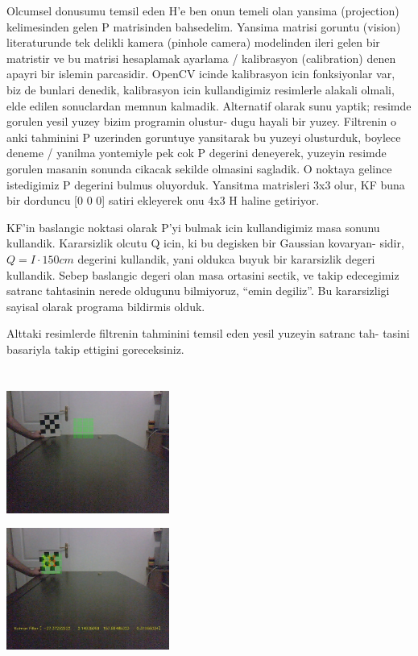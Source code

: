 \documentclass[12pt,fleqn]{article}\usepackage{../common}
\begin{document}
Olcumsel donusumu temsil eden H'e ben onun temeli olan yansima (projection)
kelimesinden gelen P matrisinden bahsedelim. Yansima matrisi goruntu
(vision) literaturunde tek delikli kamera (pinhole camera) modelinden ileri
gelen bir matristir ve bu matrisi hesaplamak ayarlama / kalibrasyon
(calibration) denen apayri bir islemin parcasidir. OpenCV icinde
kalibrasyon icin fonksiyonlar var, biz de bunlari denedik, kalibrasyon icin
kullandigimiz resimlerle alakali olmali, elde edilen sonuclardan memnun
kalmadik. Alternatif olarak sunu yaptik; resimde gorulen yesil yuzey bizim
programin olustur- dugu hayali bir yuzey. Filtrenin o anki tahminini P
uzerinden goruntuye yansitarak bu yuzeyi olusturduk, boylece deneme /
yanilma yontemiyle pek cok P degerini deneyerek, yuzeyin resimde gorulen
masanin sonunda cikacak sekilde olmasini sagladik. O noktaya gelince
istedigimiz P degerini bulmus oluyorduk. Yansitma matrisleri 3x3 olur, KF
buna bir dorduncu [0 0 0] satiri ekleyerek onu 4x3 H haline getiriyor.

KF'in baslangic noktasi olarak P'yi bulmak icin kullandigimiz masa sonunu
kullandik. Kararsizlik olcutu Q icin, ki bu degisken bir Gaussian kovaryan-
sidir, $Q = I \cdot 150 cm$ degerini kullandik, yani oldukca buyuk bir
kararsizlik degeri kullandik. Sebep baslangic degeri olan masa ortasini
sectik, ve takip edecegimiz satranc tahtasinin nerede oldugunu bilmiyoruz,
``emin degiliz''.  Bu kararsizligi sayisal olarak programa bildirmis olduk.

Alttaki resimlerde filtrenin tahminini temsil eden yesil yuzeyin satranc tah-
tasini basariyla takip ettigini goreceksiniz.

\inputminted{python}{kalman_3d.py}

\inputminted{python}{track-chess-kf.py}

\includegraphics[height=4cm]{cb-kf-00.jpg}

\includegraphics[height=4cm]{cb-kf-1.jpg}
\end{document}
